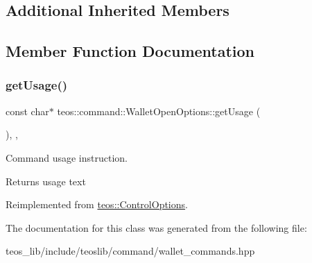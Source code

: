 \subsection*{Additional Inherited Members}


\subsection{Member Function Documentation}
\mbox{\label{classteos_1_1command_1_1_wallet_open_options_aedf25a6f772392c2cb0c0de8d80172dd}} 
\subsubsection{\texorpdfstring{get\+Usage()}{getUsage()}}
{\footnotesize\ttfamily const char$\ast$ teos\+::command\+::\+Wallet\+Open\+Options\+::get\+Usage (\begin{DoxyParamCaption}{ }\end{DoxyParamCaption})\hspace{0.3cm}{\ttfamily [inline]}, {\ttfamily [protected]}, {\ttfamily [virtual]}}



Command \textquotesingle{}usage\textquotesingle{} instruction. 

\begin{DoxyReturn}{Returns}
usage text 
\end{DoxyReturn}


Reimplemented from \mbox{\hyperlink{classteos_1_1_control_options_a0aa5671f9bc750ed5280c26c543874f3}{teos\+::\+Control\+Options}}.



The documentation for this class was generated from the following file\+:\begin{DoxyCompactItemize}
\item 
teos\+\_\+lib/include/teoslib/command/wallet\+\_\+commands.\+hpp\end{DoxyCompactItemize}
